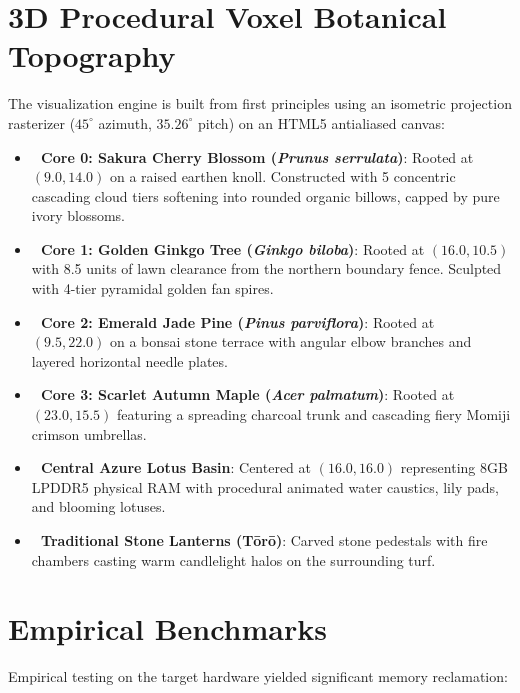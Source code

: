 \documentclass[11pt,a4paper]{article}
\begin{document}
\section{3D Procedural Voxel Botanical Topography}
The visualization engine is built from first principles using an isometric projection rasterizer ($45^\circ$ azimuth, $35.26^\circ$ pitch) on an HTML5 antialiased canvas:
\begin{itemize}
    \item \textbf{🌸 Core 0: Sakura Cherry Blossom (\textit{Prunus serrulata})}: Rooted at $(9.0, 14.0)$ on a raised earthen knoll. Constructed with 5 concentric cascading cloud tiers softening into rounded organic billows, capped by pure ivory blossoms.
    \item \textbf{🍂 Core 1: Golden Ginkgo Tree (\textit{Ginkgo biloba})}: Rooted at $(16.0, 10.5)$ with 8.5 units of lawn clearance from the northern boundary fence. Sculpted with 4-tier pyramidal golden fan spires.
    \item \textbf{🌲 Core 2: Emerald Jade Pine (\textit{Pinus parviflora})}: Rooted at $(9.5, 22.0)$ on a bonsai stone terrace with angular elbow branches and layered horizontal needle plates.
    \item \textbf{🍁 Core 3: Scarlet Autumn Maple (\textit{Acer palmatum})}: Rooted at $(23.0, 15.5)$ featuring a spreading charcoal trunk and cascading fiery Momiji crimson umbrellas.
    \item \textbf{🪷 Central Azure Lotus Basin}: Centered at $(16.0, 16.0)$ representing 8GB LPDDR5 physical RAM with procedural animated water caustics, lily pads, and blooming lotuses.
    \item \textbf{🏮 Traditional Stone Lanterns (Tōrō)}: Carved stone pedestals with fire chambers casting warm candlelight halos on the surrounding turf.
\end{itemize}

\section{Empirical Benchmarks}
Empirical testing on the target hardware yielded significant memory reclamation:
\end{document}

